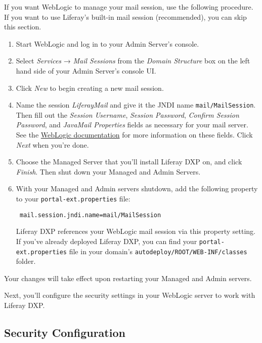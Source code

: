 If you want WebLogic to manage your mail session, use the following
procedure. If you want to use Liferay's built-in mail session
(recommended), you can skip this section.

\begin{enumerate}
\def\labelenumi{\arabic{enumi}.}
\item
  Start WebLogic and log in to your Admin Server's console.
\item
  Select \emph{Services} → \emph{Mail Sessions} from the \emph{Domain
  Structure} box on the left hand side of your Admin Server's console
  UI.
\item
  Click \emph{New} to begin creating a new mail session.
\item
  Name the session \emph{LiferayMail} and give it the JNDI name
  \texttt{mail/MailSession}. Then fill out the \emph{Session Username},
  \emph{Session Password}, \emph{Confirm Session Password}, and
  \emph{JavaMail Properties} fields as necessary for your mail server.
  See the
  \href{http://docs.oracle.com/middleware/1221/wls/FMWCH/pagehelp/Mailcreatemailsessiontitle.html}{WebLogic
  documentation} for more information on these fields. Click \emph{Next}
  when you're done.
\item
  Choose the Managed Server that you'll install Liferay DXP on, and
  click \emph{Finish}. Then shut down your Managed and Admin Servers.
\item
  With your Managed and Admin servers shutdown, add the following
  property to your \texttt{portal-ext.properties} file:

\begin{verbatim}
 mail.session.jndi.name=mail/MailSession
\end{verbatim}

  Liferay DXP references your WebLogic mail session via this property
  setting. If you've already deployed Liferay DXP, you can find your
  \texttt{portal-ext.properties} file in your domain's
  \texttt{autodeploy/ROOT/WEB-INF/classes} folder.
\end{enumerate}

Your changes will take effect upon restarting your Managed and Admin
servers.

Next, you'll configure the security settings in your WebLogic server to
work with Liferay DXP.

\subsection{Security Configuration}\label{security-configuration-2}


